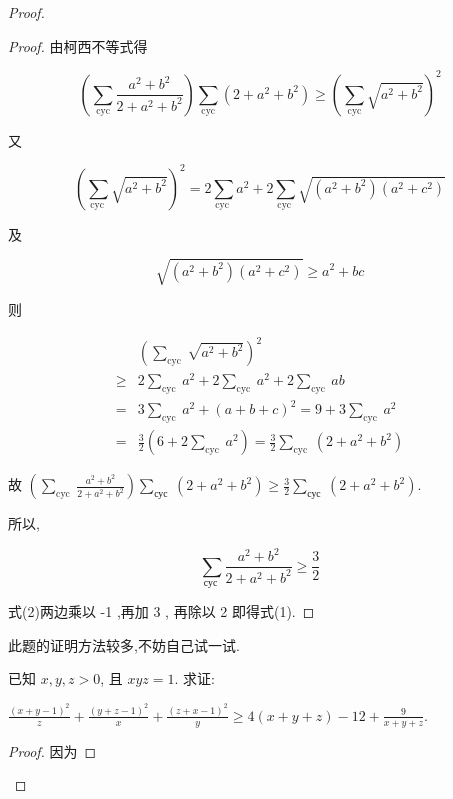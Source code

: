 \begin{proof}
\begin{proof}
	
	由柯西不等式得
	
	$$
	\left(\sum_{\mathrm{cyc}} \frac{a^{2}+b^{2}}{2+a^{2}+b^{2}}\right) \sum_{\mathrm{cyc}}\left(2+a^{2}+b^{2}\right) \geqslant\left(\sum_{\mathrm{cyc}} \sqrt{a^{2}+b^{2}}\right)^{2}
	$$
	
	又
	
	$$
	\left(\sum_{\text {cyc }} \sqrt{a^{2}+b^{2}}\right)^{2}=2 \sum_{\text {cyc }} a^{2}+2 \sum_{\text {cyc }} \sqrt{\left(a^{2}+b^{2}\right)\left(a^{2}+c^{2}\right)}
	$$
	
	及
	
	$$
	\sqrt{\left(a^{2}+b^{2}\right)\left(a^{2}+c^{2}\right)} \geqslant a^{2}+b c
	$$
	
	则
	
	$$
	\begin{aligned}
	& \left(\sum_{\text {cyc }} \sqrt{a^{2}+b^{2}}\right)^{2} \\
	\geqslant & 2 \sum_{\text {cyc }} a^{2}+2 \sum_{\text {cyc }} a^{2}+2 \sum_{\text {cyc }} a b \\
	= & 3 \sum_{\text {cyc }} a^{2}+(a+b+c)^{2}=9+3 \sum_{\text {cyc }} a^{2} \\
	= & \frac{3}{2}\left(6+2 \sum_{\text {cyc }} a^{2}\right)=\frac{3}{2} \sum_{\text {cyc }}\left(2+a^{2}+b^{2}\right)
	\end{aligned}
	$$
	
	故 $\left(\sum_{\text {cyc }} \frac{a^{2}+b^{2}}{2+a^{2}+b^{2}}\right) \sum_{\text {сус }}\left(2+a^{2}+b^{2}\right) \geqslant \frac{3}{2} \sum_{\text {сус }}\left(2+a^{2}+b^{2}\right)$.
	
	所以,
	
	
	\begin{equation*}
	\sum_{\text {сус }} \frac{a^{2}+b^{2}}{2+a^{2}+b^{2}} \geqslant \frac{3}{2} \tag{2}
	\end{equation*}
	
	
	式(2)两边乘以 -1 ,再加 3 , 再除以 2 即得式(1).
\end{proof}
\begin{note}
	此题的证明方法较多,不妨自己试一试.
\end{note}

\begin{example}
	已知 $x, y, z>0$, 且 $x y z=1$. 求证:
	
	$\frac{(x+y-1)^{2}}{z}+\frac{(y+z-1)^{2}}{x}+\frac{(z+x-1)^{2}}{y} \geqslant 4(x+y+z)-12+\frac{9}{x+y+z}$.
\end{example}
\begin{proof}
	因为
	

\end{proof}
\end{proof}
